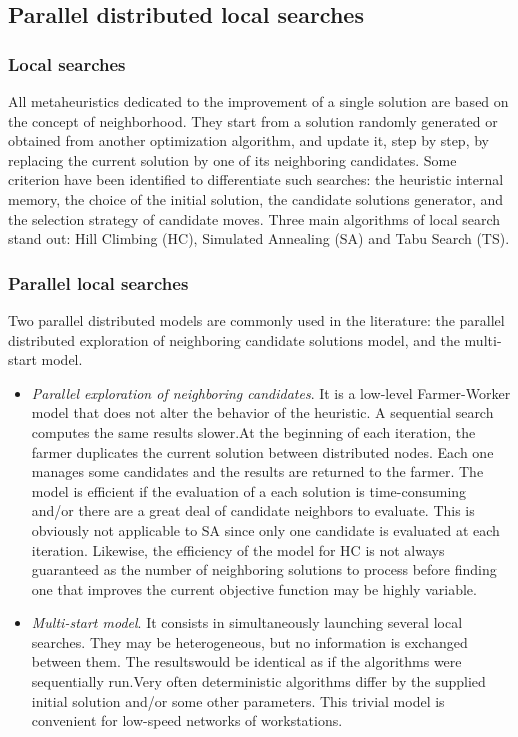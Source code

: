 \hypertarget{main_parallel_ls}{}\subsection{Parallel distributed local searches}\label{main_parallel_ls}
\hypertarget{main_local_searches}{}\subsubsection{Local searches}\label{main_local_searches}
All metaheuristics dedicated to the improvement of a single solution are based on the concept of neighborhood. They start from a solution randomly generated or obtained from another optimization algorithm, and update it, step by step, by replacing the current solution by one of its neighboring candidates. Some criterion have been identified to differentiate such searches: the heuristic internal memory, the choice of the initial solution, the candidate solutions generator, and the selection strategy of candidate moves. Three main algorithms of local search stand out: Hill Climbing (HC), Simulated Annealing (SA) and Tabu Search (TS).\hypertarget{main_parallel_local_searches}{}\subsubsection{Parallel local searches}\label{main_parallel_local_searches}
Two parallel distributed models are commonly used in the literature: the parallel distributed exploration of neighboring candidate solutions model, and the multi-start model. \begin{itemize}
\item {\em Parallel exploration of neighboring candidates\/}. It is a low-level Farmer-Worker model that does not alter the behavior of the heuristic. A sequential search computes the same results slower.At the beginning of each iteration, the farmer duplicates the current solution between distributed nodes. Each one manages some candidates and the results are returned to the farmer. The model is efficient if the evaluation of a each solution is time-consuming and/or there are a great deal of candidate neighbors to evaluate. This is obviously not applicable to SA since only one candidate is evaluated at each iteration. Likewise, the efficiency of the model for HC is not always guaranteed as the number of neighboring solutions to process before finding one that improves the current objective function may be highly variable.

\item {\em Multi-start model\/}. It consists in simultaneously launching several local searches. They may be heterogeneous, but no information is exchanged between them. The resultswould be identical as if the algorithms were sequentially run.Very often deterministic algorithms differ by the supplied initial solution and/or some other parameters. This trivial model is convenient for low-speed networks of workstations. \end{itemize}
